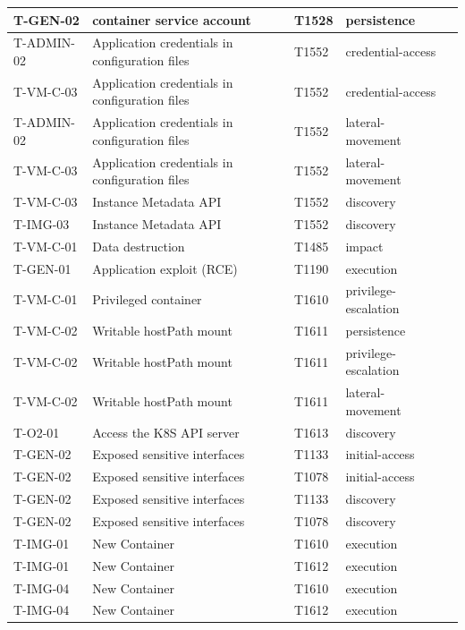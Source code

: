 \begin{longtable}{|l|l|l|l|l|}
T-GEN-02 & container service account & T1528 & persistence \\ \hline
T-ADMIN-02 & Application credentials in configuration files & T1552 & credential-access \\ \hline
T-VM-C-03 & Application credentials in configuration files & T1552 & credential-access \\ \hline
T-ADMIN-02 & Application credentials in configuration files & T1552 & lateral-movement \\ \hline
T-VM-C-03 & Application credentials in configuration files & T1552 & lateral-movement \\ \hline
T-VM-C-03 & Instance Metadata API & T1552 & discovery \\ \hline
T-IMG-03 & Instance Metadata API & T1552 & discovery \\ \hline
T-VM-C-01 & Data destruction & T1485 & impact \\ \hline
T-GEN-01 & Application exploit (RCE) & T1190 & execution \\ \hline
T-VM-C-01 & Privileged container & T1610 & privilege-escalation \\ \hline
T-VM-C-02 & Writable hostPath mount & T1611 & persistence \\ \hline
T-VM-C-02 & Writable hostPath mount & T1611 & privilege-escalation \\ \hline
T-VM-C-02 & Writable hostPath mount & T1611 & lateral-movement \\ \hline
T-O2-01 & Access the K8S API server & T1613 & discovery \\ \hline
T-GEN-02 & Exposed sensitive interfaces & T1133 & initial-access \\ \hline
T-GEN-02 & Exposed sensitive interfaces & T1078 & initial-access \\ \hline
T-GEN-02 & Exposed sensitive interfaces & T1133 & discovery \\ \hline
T-GEN-02 & Exposed sensitive interfaces & T1078 & discovery \\ \hline
T-IMG-01 & New Container & T1610 & execution \\ \hline
T-IMG-01 & New Container & T1612 & execution \\ \hline
T-IMG-04 & New Container & T1610 & execution \\ \hline
T-IMG-04 & New Container & T1612 & execution \\ \hline
\end{longtable}
\restoregeometry

